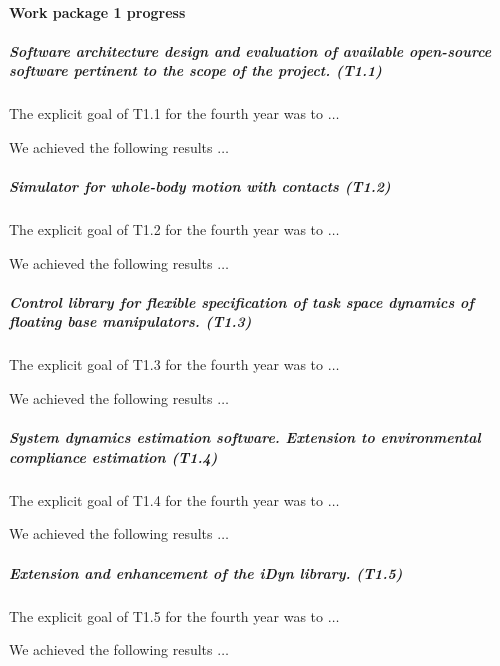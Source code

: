 

\paragraph{Work package 1 progress}

\subparagraph{Software architecture design and evaluation of available open-source software pertinent to the scope of the project. (T1.1)}

The explicit goal of T1.1 for the fourth year was to $\dots$

We achieved the following results $\dots$

\subparagraph{Simulator for whole-body motion with contacts (T1.2)}

The explicit goal of T1.2 for the fourth year was to $\dots$

We achieved the following results $\dots$

\subparagraph{Control library for flexible specification of task space dynamics of floating base manipulators. (T1.3)}

The explicit goal of T1.3 for the fourth year was to $\dots$

We achieved the following results $\dots$

\subparagraph{System dynamics estimation software. Extension to
environmental compliance estimation (T1.4)}

The explicit goal of T1.4 for the fourth year was to $\dots$

We achieved the following results $\dots$

\subparagraph{Extension and enhancement of the iDyn library. (T1.5)}

The explicit goal of T1.5 for the fourth year was to $\dots$

We achieved the following results $\dots$
